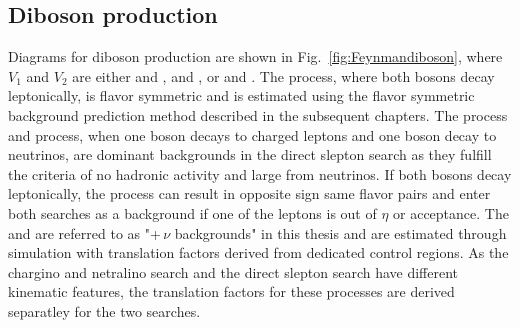 \subsection{Diboson production}
Diagrams for diboson production are shown in Fig.~\ref{fig:Feynmandiboson}, where $V_1$ and $V_2$ are either \PW and \PW, \PZ and \PZ, or \PW and \PZ. 
The \PWW process, where both \PW bosons decay leptonically, is flavor symmetric and is estimated using the flavor symmetric background prediction method described in the subsequent chapters. 
The \PWW process and \PZZ process, when one \PZ boson decays to charged leptons and one \PZ boson decay to neutrinos, are dominant backgrounds in the direct slepton search as they fulfill the criteria of no hadronic activity and large \ptmiss from neutrinos. 
If both bosons decay leptonically, the \PWZ process can result in opposite sign same flavor pairs and enter both searches as a background if one of the leptons is out of $\eta$ or \pt acceptance. 
The \PZZ and \PWZ are referred to as "\PZ+$\,\nu$ backgrounds" in this thesis and are estimated through simulation with translation factors derived from dedicated control regions. 
As the chargino and netralino search and the direct slepton search have different kinematic features, the translation factors for these processes are derived separatley for the two searches.
